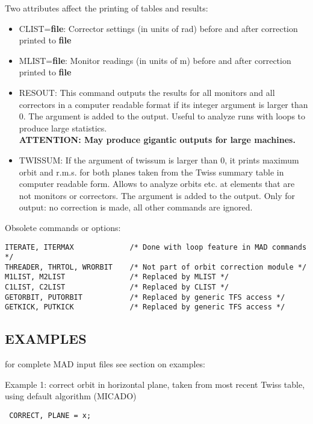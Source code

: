 Two attributes affect the printing of tables and results: 
\begin{itemize}
   \item CLIST=\textbf{file}: Corrector settings (in units of rad)
     before and after correction printed to \textbf{file} 

   \item MLIST=\textbf{file}: Monitor readings (in units of m) before
     and after correction printed to \textbf{file} 

   \item RESOUT: This command outputs the results for all monitors and
     all correctors in a computer readable format if its integer
     argument is larger than 0. The argument is added to the
     output. Useful to analyze runs with loops to produce large
     statistics. 
     \\\textbf{ATTENTION: May produce gigantic outputs for large
       machines.} 
     \\

   \item TWISSUM:  If the argument of twissum is larger than 0, it
     prints maximum orbit and r.m.s. for both planes taken from the
     Twiss summary table in computer readable form. Allows to analyze
     orbits etc. at elements that are not monitors or correctors. The
     argument is added to the output.  Only for output: no correction is
     made, all other commands are ignored.  
\end{itemize}

Obsolete commands or options:
\begin{verbatim}
ITERATE, ITERMAX             /* Done with loop feature in MAD commands */
THREADER, THRTOL, WRORBIT    /* Not part of orbit correction module */
M1LIST, M2LIST               /* Replaced by MLIST */
C1LIST, C2LIST               /* Replaced by CLIST */
GETORBIT, PUTORBIT           /* Replaced by generic TFS access */
GETKICK, PUTKICK             /* Replaced by generic TFS access */
\end{verbatim}

\subsection{EXAMPLES} 

for complete MAD input files see section on examples:

Example 1: correct orbit in horizontal plane, taken from most recent
Twiss table, using default algorithm (MICADO)
\begin{verbatim}
 CORRECT, PLANE = x; 
\end{verbatim}

